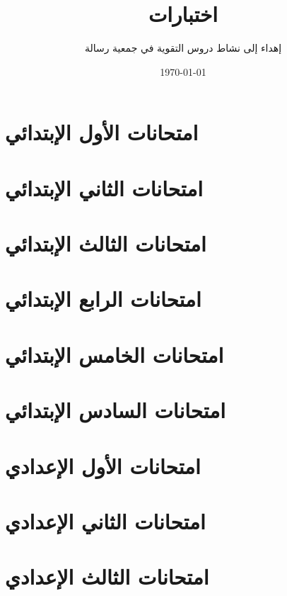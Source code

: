 \documentclass[a4paper,14pt]{article}
\title{اختبارات}
\author{\textarabic{إهداء إلى نشاط دروس التقوية في جمعية رسالة}}
\date{\today}
\begin{document}
\maketitle
\tableofcontents
\section{امتحانات الأول الإبتدائي}
\section{امتحانات الثاني الإبتدائي}
\section{امتحانات الثالث الإبتدائي}
\section{امتحانات الرابع الإبتدائي}
\section{امتحانات الخامس الإبتدائي}
\section{امتحانات السادس الإبتدائي}
\section{امتحانات الأول الإعدادي}
\section{امتحانات الثاني الإعدادي}
\section{امتحانات الثالث الإعدادي}


\end{document}
